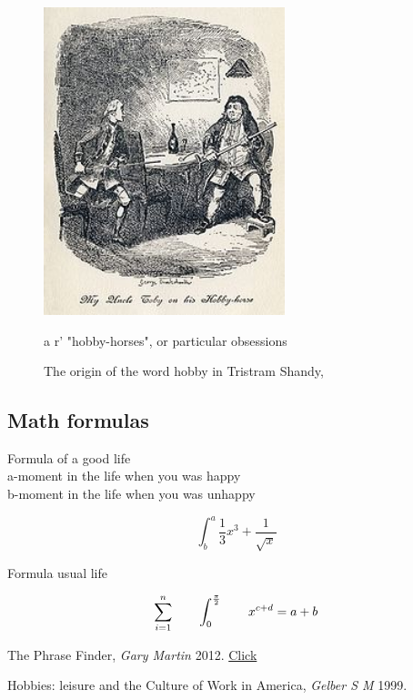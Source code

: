 \documentclass{article}
\begin{document}
\begin{figure}[ht]
\begin{center}
\includegraphics[width=7cm]{hobby.jpg}
\caption{The origin of the word hobby in Tristram Shandy,} {a r' "hobby-horses", or particular obsessions}
\label{rys_model}
\end{center}
\end{figure}

\subsection{Math formulas}
\begin{center}
Formula of a good life\\
a-moment in the life when you was happy\\
b-moment in the life when you was unhappy
\end{center}
$$\int^a_b \frac{1}{3}x^3+\frac{1}{\sqrt{x}}$$
\begin{center}
Formula usual life
\end{center}
\begin{equation}
\sum_{i=1}^{n} \qquad \int_{0}^{\frac{\pi}{2}} \qquad x^ {c+d}={a+b}\\
\end{equation}

\newpage
\begin{thebibliography}{9}
The Phrase Finder,
\emph{ Gary Martin }
2012.
\href{https://www.loc.gov/item/lcwaN0004219/}{Click}
 
Hobbies: leisure and the Culture of Work in America,
\emph{ Gelber S M }
1999.
\end{thebibliography}
\end{document}
